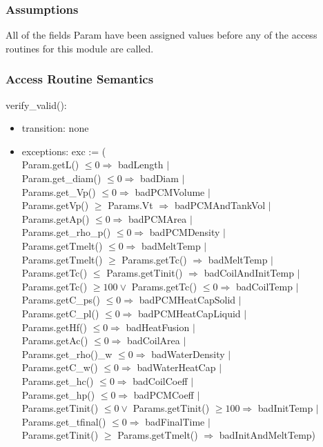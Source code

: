 \documentclass[12pt]{article}
\begin{document}

\subsubsection{Assumptions}

All of the fields Param have been assigned values before any of the access
routines for this module are called.

\subsubsection{Access Routine Semantics}

verify\_valid(): 
\begin{itemize}
\item transition: none
\item exceptions: exc := (\\
Param.getL() $\leq 0 \Rightarrow$ badLength $|$\\
Param.get\_diam() $\leq 0 \Rightarrow$ badDiam $|$\\
Params.get\_Vp() $\leq 0 \Rightarrow$ badPCMVolume $|$\\
Params.getVp() $\geq$ Params.Vt $\Rightarrow$ badPCMAndTankVol $|$\\
Params.getAp() $\leq 0 \Rightarrow$ badPCMArea $|$\\
Params.get\_rho\_p() $\leq 0 \Rightarrow$ badPCMDensity $|$\\
Params.getTmelt() $\leq 0 \Rightarrow$ badMeltTemp $|$\\
Params.getTmelt() $\geq$ Params.getTc() $\Rightarrow$ badMeltTemp $|$\\
Params.getTc() $\leq$ Params.getTinit() $\Rightarrow$ badCoilAndInitTemp $|$\\
Params.getTc() $\geq 100 \lor$ Params.getTc() $\leq 0 \Rightarrow$ badCoilTemp $|$\\
Params.getC\_ps() $\leq 0 \Rightarrow$ badPCMHeatCapSolid $|$\\
Params.getC\_pl() $\leq 0 \Rightarrow$ badPCMHeatCapLiquid $|$\\
Params.getHf() $\leq 0 \Rightarrow$ badHeatFusion $|$\\
Params.getAc() $\leq 0 \Rightarrow$ badCoilArea $|$\\
Params.get\_rho()\_w $\leq 0 \Rightarrow$ badWaterDensity $|$\\
Params.getC\_w() $\leq 0 \Rightarrow$ badWaterHeatCap $|$\\
Params.get\_hc() $\leq 0 \Rightarrow$ badCoilCoeff $|$\\
Params.get\_hp() $\leq 0 \Rightarrow$ badPCMCoeff $|$\\
Params.getTinit() $\leq 0 \lor$ Params.getTinit() $\geq 100 \Rightarrow$
badInitTemp $|$\\
Params.get\_tfinal() $\leq 0 \Rightarrow$ badFinalTime $|$\\
Params.getTinit() $\geq$ Params.getTmelt() $\Rightarrow$ badInitAndMeltTemp)  
\end{itemize}
\end{document}
